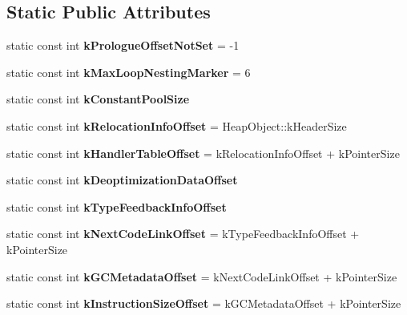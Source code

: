 \subsection*{Static Public Attributes}
\begin{DoxyCompactItemize}
\item 
static const int {\bfseries k\+Prologue\+Offset\+Not\+Set} = -\/1\hypertarget{classv8_1_1internal_1_1_code_af29d8cba6d0ad254e8495cf93f3eb17f}{}\label{classv8_1_1internal_1_1_code_af29d8cba6d0ad254e8495cf93f3eb17f}

\item 
static const int {\bfseries k\+Max\+Loop\+Nesting\+Marker} = 6\hypertarget{classv8_1_1internal_1_1_code_af68a87cf29bd9a110d9daedc1fcfd349}{}\label{classv8_1_1internal_1_1_code_af68a87cf29bd9a110d9daedc1fcfd349}

\item 
static const int {\bfseries k\+Constant\+Pool\+Size}
\item 
static const int {\bfseries k\+Relocation\+Info\+Offset} = Heap\+Object\+::k\+Header\+Size\hypertarget{classv8_1_1internal_1_1_code_abc5dee556e430a443fa8e9740a68b5dc}{}\label{classv8_1_1internal_1_1_code_abc5dee556e430a443fa8e9740a68b5dc}

\item 
static const int {\bfseries k\+Handler\+Table\+Offset} = k\+Relocation\+Info\+Offset + k\+Pointer\+Size\hypertarget{classv8_1_1internal_1_1_code_a63498b53776675a50af64ed19375a581}{}\label{classv8_1_1internal_1_1_code_a63498b53776675a50af64ed19375a581}

\item 
static const int {\bfseries k\+Deoptimization\+Data\+Offset}
\item 
static const int {\bfseries k\+Type\+Feedback\+Info\+Offset}
\item 
static const int {\bfseries k\+Next\+Code\+Link\+Offset} = k\+Type\+Feedback\+Info\+Offset + k\+Pointer\+Size\hypertarget{classv8_1_1internal_1_1_code_a17ceb66548832c3a579cac433ce5d8c8}{}\label{classv8_1_1internal_1_1_code_a17ceb66548832c3a579cac433ce5d8c8}

\item 
static const int {\bfseries k\+G\+C\+Metadata\+Offset} = k\+Next\+Code\+Link\+Offset + k\+Pointer\+Size\hypertarget{classv8_1_1internal_1_1_code_afaea58c28ff9bb0fc3090025bc6682b8}{}\label{classv8_1_1internal_1_1_code_afaea58c28ff9bb0fc3090025bc6682b8}

\item 
static const int {\bfseries k\+Instruction\+Size\+Offset} = k\+G\+C\+Metadata\+Offset + k\+Pointer\+Size\hypertarget{classv8_1_1internal_1_1_code_a3e586e823b9236fabe55611465c30846}{}\label{classv8_1_1internal_1_1_code_a3e586e823b9236fabe55611465c30846}


\end{DoxyCompactItemize}
